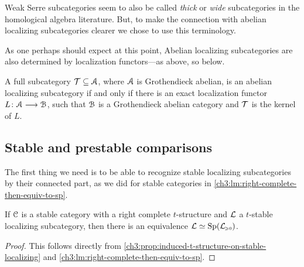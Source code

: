 \begin{remark}
    Weak Serre subcategories seem to also be called \emph{thick} or \emph{wide} subcategories in the homological algebra literature. But, to make the connection with abelian localizing subcategories clearer we chose to use this terminology. 
\end{remark}

As one perhaps should expect at this point, Abelian localizing subcategories are also determined by localization functors---as above, so below. 

\begin{proposition}
    \label{ch3:prop:abelian-localizing-iff-kernel-of-localization}
    A full subcategory $\mathcal{T}\subseteq \EuScript{A}$, where $\EuScript{A}$ is Grothendieck abelian, is an abelian localizing subcategory if and only if there is an exact localization functor $L\colon\EuScript{A}\longrightarrow \EuScript{B}$, such that $\EuScript{B}$ is a Grothendieck abelian category and $\mathcal{T}$ is the kernel of $L$. 
\end{proposition}







\subsection{Stable and prestable comparisons}

The first thing we need is to be able to recognize stable localizing subcategories by their connected part, as we did for stable categories in \cref{ch3:lm:right-complete-then-equiv-to-sp}. 

\begin{corollary}
    \label{ch3:cor:t-stable-implies-equiv-to-sp}
    If $\EuScript{C}$ is a stable category with a right complete $t$-structure and $\mathcal{L}$ a $t$-stable localizing subcategory, then there is an equivalence $\mathcal{L}\simeq \mathrm{Sp}(\mathcal{L}_{\hspace{-1pt}\scriptscriptstyle\geqslant 0})$. 
\end{corollary}
\begin{proof}
    This follows directly from \cref{ch3:prop:induced-t-structure-on-stable-localizing} and \cref{ch3:lm:right-complete-then-equiv-to-sp}.
\end{proof}

